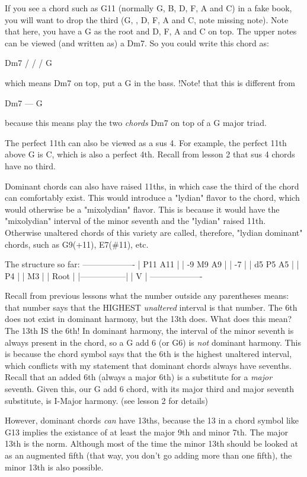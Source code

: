 If you see a chord such as G11 (normally G, B, D, F, A and C) in a fake book,
you will want to drop the third (G,  , D, F, A and C, note missing note). Note 
that here, you have a G as the root and D, F, A and C on top. The upper notes 
can be viewed (and written as) a Dm7. So you could write this chord as:

                Dm7 /
                   /
                  /  G

which means Dm7 on top, put a G in the bass. !Note! that this is different from

              Dm7
              ---
               G

because this means play the two \emph{chords} Dm7 on top of a G major triad.

The perfect 11th can also be viewed as a sus 4. For example, the perfect 11th
above G is C, which is also a perfect 4th. Recall from lesson 2 that sus 4
chords have no third.

Dominant chords can also have raised 11ths, in which case the third of the
chord can comfortably exist. This would introduce a "lydian" flavor to the
chord, which would otherwise be a "mixolydian" flavor. This is because it
would have the "mixolydian" interval of the minor seventh and the "lydian"
raised 11th. Otherwise unaltered chords of this variety are called, therefore,
"lydian dominant" chords, such as G9(+11), E7(\#11), etc.

The structure so far:
-------------------
|      P11  A11   |
| -9    M9   A9   |
|       -7        |
|  d5   P5   A5   |
|       P4        |
|       M3        |
|      Root       |
|-----------------|
|        V        |
-------------------

Recall from previous lessons what the number outside any parentheses means:
that number says that the HIGHEST \emph{unaltered} interval is that number. The
6th does not exist in dominant harmony, but the 13th does. What does this
mean? The 13th IS the 6th! In dominant harmony, the interval of the minor
seventh is always present in the chord, so a G add 6 (or G6) is \emph{not} dominant
harmony. This is because the chord symbol says that the 6th is the highest
unaltered interval, which conflicts with my statement that dominant chords
always have sevenths. Recall that an added 6th (always a major 6th) is a
substitute for a \emph{major} seventh. Given this, our G add 6 chord, with its
major third and major seventh substitute, is I-Major harmony. (see lesson
2 for details)

However, dominant chords \emph{can} have 13ths, because the 13 in a chord symbol
like G13 implies the existance of at least the major 9th and minor 7th.
The major 13th is the norm. Although most of the time the minor 13th should
be looked at as an augmented fifth (that way, you don't go adding more than
one fifth), the minor 13th is also possible.

